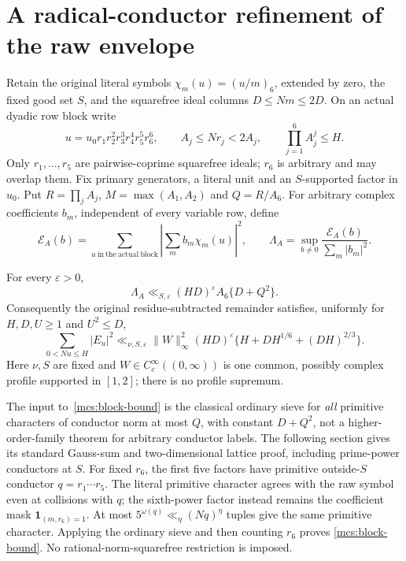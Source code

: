 \section{A radical-conductor refinement of the raw envelope}\label{mcs:core}
Retain the original literal symbols $\chi_m(u)=(u/m)_6$, extended by zero,
the fixed good set $S$, and the squarefree ideal columns $D\le Nm\le2D$.
On an actual dyadic row block write
\[
 u=u_0r_1r_2^2r_3^3r_4^4r_5^5r_6^6,\qquad
 A_j\le Nr_j<2A_j,\qquad \prod_{j=1}^6A_j^j\le H.
\]
Only $r_1,\ldots,r_5$ are pairwise-coprime squarefree ideals;
$r_6$ is arbitrary and may overlap them. Fix primary generators,
a literal unit and an $S$-supported factor in $u_0$. Put
$R=\prod_jA_j$, $M=\max(A_1,A_2)$ and $Q=R/A_6$.
For arbitrary complex coefficients $b_m$, independent of every variable row,
define
\[
 \mathcal E_A(b)=\sum_{u\ \mathrm{in\ the\ actual\ block}}
       \left|\sum_m b_m\chi_m(u)\right|^2,
 \qquad \Lambda_A=\sup_{b\ne0}\frac{\mathcal E_A(b)}{\sum_m|b_m|^2}.
\]
\begin{proposition}\label{mcs:block}
For every $\varepsilon>0$,
\begin{equation}\label{mcs:block-bound}
 \Lambda_A\ll_{S,\varepsilon}(HD)^\varepsilon
             A_6\{D+Q^2\}.
\end{equation}
Consequently the original residue-subtracted remainder satisfies,
uniformly for $H,D,U\ge1$ and $U^2\le D$,
\begin{equation}\label{mcs:uniform}
 \sum_{0<Nu\le H}|E_u|^2
 \ll_{\nu,S,\varepsilon}\|W\|_\infty^2(HD)^\varepsilon
       \{H+DH^{1/6}+(DH)^{2/3}\}.
\end{equation}
Here $\nu,S$ are fixed and $W\in C_c^\infty((0,\infty))$ is one common,
possibly complex profile supported in $[1,2]$; there is no profile supremum.
\end{proposition}
The input to~\eqref{mcs:block-bound} is the classical ordinary sieve for
\emph{all} primitive characters of conductor norm at most $Q$, with constant
$D+Q^2$, not a higher-order-family theorem for arbitrary conductor labels.
The following section gives its standard Gauss-sum and two-dimensional
lattice proof, including prime-power conductors at $S$.
For fixed $r_6$, the first five factors have primitive outside-$S$
conductor $q=r_1\cdots r_5$. The literal primitive character agrees with
the raw symbol even at collisions with $q$; the sixth-power factor instead
remains the coefficient mask $\mathbf1_{(m,r_6)=1}$.
At most $5^{\omega(q)}\ll_\eta(Nq)^\eta$ tuples give the same primitive
character. Applying the ordinary sieve and then counting $r_6$ proves
\eqref{mcs:block-bound}. No rational-norm-squarefree restriction is imposed.

